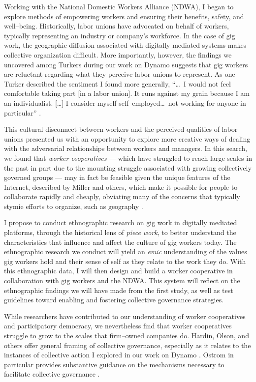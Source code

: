 \documentclass{article}
\begin{document}
Working with the National Domestic Workers Alliance (NDWA),
I began to explore methods of empowering workers and ensuring their benefits, safety, and well--being.
Historically, labor unions have advocated on behalf of workers,
typically representing an industry or company's workforce.
In the case of gig work,
the geographic diffusion associated with digitally mediated systems
makes collective organization difficult.
More importantly, however,
the findings we uncovered among Turkers during our work on Dynamo
suggests that gig workers are reluctant regarding what they perceive labor unions to represent.
As one Turker described the sentiment I found more generally,
``\dots~I would not feel comfortable taking part [in a labor union].
It runs against my grain because I am an individualist.
[\dots] I consider myself self--employed\dots~not working for anyone in particular''
\citep{dynamo}.

This cultural disconnect between workers and the perceived qualities of labor unions presented us with an opportunity
to explore more creative ways of dealing with the adversarial relationships between workers and managers.
In this search, we found that \textit{worker cooperatives}
--- which have struggled to reach large scales in the past in part due to the mounting struggle associated with growing collectively governed groups ---
may in fact be feasible given the unique features of the Internet, 
described by Miller and others,
which make it possible for people to collaborate rapidly and cheaply,
obviating many of the concerns that typically stymie efforts to organize,
such as geography
\citep{miller2011understanding}.

I propose to conduct ethnographic research on gig work in digitally mediated platforms,
through the historical lens of \textit{piece work},
to better understand the characteristics that influence and affect the culture of gig workers today.
The ethnographic research we conduct will yield an \textit{emic} understanding of
the values gig workers hold and their sense of self as they relate to the work they do.
With this ethnographic data,
I will then design and build a worker cooperative in collaboration with gig workers and the NDWA.
This system will reflect on the ethnographic findings we will have made from the first study,
as well as test guidelines toward enabling and fostering collective governance strategies.


While researchers have contributed to our understanding of worker cooperatives and participatory democracy,
we nevertheless find that worker cooperatives struggle to grow to the scales that firm--owned companies do.
Hardin, Olson, and others offer general framing of collective governance,
especially as it relates to the instances of collective action I explored in our work on Dynamo
\citep{russell1982collective,olsonlogic}.
Ostrom in particular provides substantive guidance on the mechanisms necessary to facilitate collective governance
\citep{ostrom1990governing}.
\end{document}
